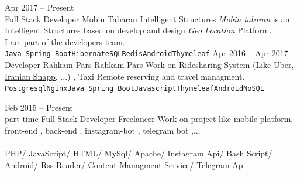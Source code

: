 \documentclass[8pt]{developercv} %
\begin{document}
\begin{entrylist}
	\entry
		{Apr 2017 -- Present\\}
		{Full Stack Developer}
		{\href{http://mobintabaran.ir}{Mobin Tabaran Intelligent Structures}}
		{\textsl{Mobin tabaran} is an Intelligent Structures based on develop and design \textit{Geo Location} Platform.\\ I am part of the developers team.\\
		\texttt{Java Spring Boot}\slashsep\texttt{Hibernate}\slashsep\texttt{SQL}\slashsep\texttt{Redis}\slashsep\texttt{Android}\slashsep\texttt{Thymeleaf}}
	\entry
		{Apr 2016 -- Apr 2017\\}
		{Developer}
		{Rahkam Pars}
		{Rahkam Pars Work on Ridesharing System (Like
		\href{https://www.uber.com/}{Uber},
		\href{https://snapp.ir/}{Iranian Snapp},
		...) , Taxi Remote reserving and travel managment.\\
		\texttt{Postgresql}\slashsep\texttt{Nginx}\slashsep\texttt{Java Spring Boot}\slashsep\texttt{Javascript}\slashsep\texttt{Thymeleaf}\slashsep\texttt{Android}\slashsep\texttt{NoSQL}
		}

	\entry
		{Feb 2015 -- Present\\\footnotesize{part time}}
		{Full Stack Developer}
		{Freelancer}
		{Work on project like mobile platform, front-end , back-end , instagram-bot , telegram bot ,...\\\\
		\small{PHP}\space\space/\space\space
		\small{JavaScript}\space\space/\space\space
		\small{HTML}\space\space/\space\space
		\small{MySql}\space\space/\space\space
		\small{Apache}\space\space/\space\space
		\small{Instagram Api}\space\space/\space\space
		\small{Bash Script}\space\space/\space\space
		\small{Android}\space\space/\space\space
		\small{Rss Reader}\space\space/\space\space
		\small{Content Managment Service}\space\space/\space\space
		\small{Telegram Api}}


\end{entrylist}

\noindent\rule{\textwidth}{1pt}

\vspace{5pt} %
\end{document}
